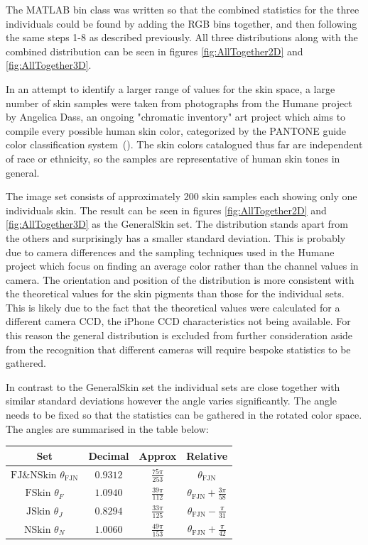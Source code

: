 The MATLAB bin class was written so that the combined statistics for the three individuals could be found by adding the RGB bins together, and then following the same steps 1-8 as described previously. All three distributions along with the combined distribution can be seen in figures \ref{fig:AllTogether2D} and \ref{fig:AllTogether3D}.


In an attempt to identify a larger range of values for the skin space, a large number of skin samples were taken from photographs from the Humane project by Angelica Dass, an ongoing "chromatic inventory" art project which aims to compile every possible human skin color, categorized by the PANTONE guide color classification system~(\cite{Dass2012}). The skin colors catalogued thus far are independent of race or ethnicity, so the samples are representative of human skin tones in general.

The image set consists of approximately 200 skin samples  each showing only one individuals skin. The result can be seen in figures \ref{fig:AllTogether2D} and \ref{fig:AllTogether3D} as the GeneralSkin set. The distribution stands apart from the others and surprisingly has a smaller standard deviation. This is probably due to camera differences and the sampling techniques used in the Humane project which focus on finding an average color rather than the channel values in camera. The orientation and position of the distribution is more consistent with the theoretical values for the skin pigments than those for the individual sets. This is likely due to the fact that the theoretical values were calculated for a different camera CCD, the iPhone CCD characteristics not being available. For this reason the general distribution is excluded from further consideration aside from the recognition that different cameras will require bespoke statistics to be gathered. 

In contrast to the GeneralSkin set the individual sets are close together with similar standard deviations however the angle varies significantly. The angle needs to be fixed so that the statistics can be gathered in the rotated color space. The angles are summarised in the table below:

\begin{tabular}{|c|c|c|c|}
\hline   Set                                                             & Decimal   & Approx                       & Relative \\ 
\hline   $\text{FJ$\&$NSkin }\theta _{\text{FJN}}$ & $0.9312$ & $\frac{75 \pi }{253}$ & $\theta _{\text{FJN}}$ \\
\hline   $\text{FSkin }\theta _F$                            & $1.0940$ & $\frac{39 \pi }{112}$ & $\theta _{\text{FJN}}+\frac{3 \pi }{58}$ \\
\hline   $\text{JSkin }\theta _J$                             & $0.8294$ & $\frac{33 \pi }{125}$ & $\theta _{\text{FJN}}-\frac{\pi }{31}$ \\
\hline   $\text{NSkin }\theta _N$                          & $1.0060$ & $\frac{49 \pi }{153}$ & $\theta _{\text{FJN}}+\frac{\pi }{42} $\\
\hline 
\end{tabular} 

